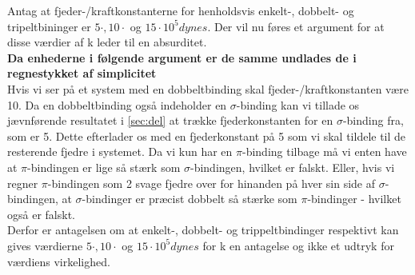 Antag at fjeder-/kraftkonstanterne for henholdsvis enkelt-, dobbelt- og tripeltbininger er $5 \cdot, 10 \cdot$ og $15 \cdot 10^5 dynes$. Der vil nu føres et argument for at disse værdier af k leder til en absurditet. 
\\
\textbf{Da enhederne i følgende argument er de samme undlades de i regnestykket af simplicitet}
\\
Hvis vi ser på et system med en dobbeltbinding skal fjeder-/kraftkonstanten være 10. Da en dobbeltbinding også indeholder en $\sigma$-binding kan vi tillade os jævnførende resultatet i \ref{sec:del} at trække fjederkonstanten for en $\sigma$-binding fra, som er 5. Dette efterlader os med en fjederkonstant på 5 som vi skal tildele til de resterende fjedre i systemet. Da vi kun har en $\pi$-binding tilbage må vi enten have at $\pi$-bindingen er lige så stærk som $\sigma$-bindingen, hvilket er falskt. Eller, hvis vi regner $\pi$-bindingen som 2 svage fjedre over for hinanden på hver sin side af $\sigma$-bindingen, at $\sigma$-bindinger er præcist dobbelt så stærke som $\pi$-bindinger - hvilket også er falskt.
\\

Derfor er antagelsen om at enkelt-, dobbelt- og trippeltbindinger respektivt kan gives værdierne $5 \cdot, 10 \cdot$ og $15 \cdot 10^5 dynes$ for k en antagelse og ikke et udtryk for værdiens virkelighed. 